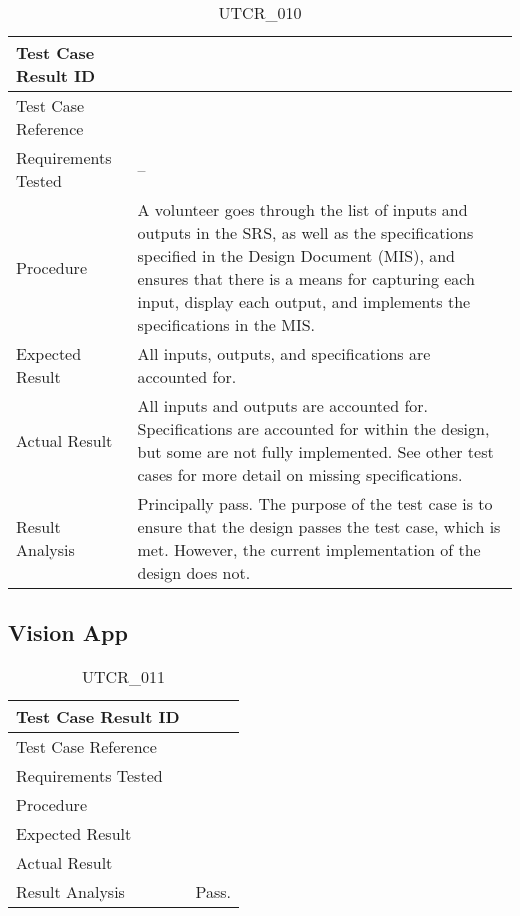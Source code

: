 \documentclass[12pt, titlepage]{article}
\begin{document}
\begin{table}[!h]
\begin{center}
\caption {UTCR\_010}
\label{tab:UTCR_010}
\begin{tabular}{ | m{3.2cm} | m{12.2cm} | } 
\hline
Test Case Result ID & \nameref{tab:UTCR_010} \\ 
\hline
Test Case Reference & \nameref{tab:UTC_010}  \\ 
\hline
Requirements Tested & -- \\ 
\hline
Procedure & A volunteer goes through the list of inputs and outputs in the SRS, as well as the specifications specified in the Design Document (MIS), and ensures that there is a means for capturing each input, display each output, and implements the specifications in the MIS. \\ 
\hline
Expected Result & All inputs, outputs, and specifications are accounted for.  \\ 
\hline
Actual Result & All inputs and outputs are accounted for. Specifications are accounted for within the design, but some are not fully implemented. See other test cases for more detail on missing specifications. \\ 
\hline
Result Analysis & Principally pass. The purpose of the test case is to ensure that the design passes the test case, which is met. However, the current implementation of the design does not. \\ 
\hline
\end{tabular}
\end{center}
\end{table}

\clearpage

\subsection{Vision App}
\label{subsec:visionApp}

\begin{table}[!h]
\begin{center}
\caption {UTCR\_011}
\label{tab:UTCR_011}
\begin{tabular}{ | m{3.2cm} | m{12.2cm} | } 
\hline
Test Case Result ID & \nameref{tab:UTCR_011} \\ 
\hline
Test Case Reference & \nameref{tab:UTC_011}  \\ 
\hline
Requirements Tested & \\ 
\hline
Procedure &  \\ 
\hline
Expected Result &  \\ 
\hline
Actual Result &  \\ 
\hline
Result Analysis & Pass. \\ 
\hline
\end{tabular}
\end{center}
\end{table}
\end{document}
